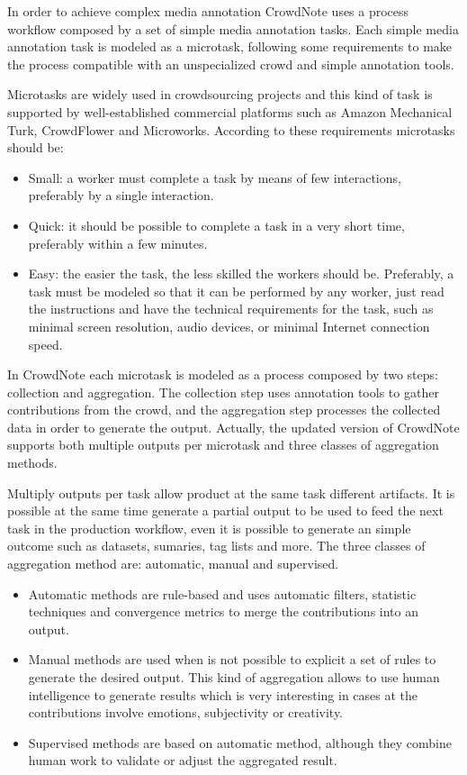 In order to achieve complex media annotation CrowdNote uses a process workflow composed by a set of simple media annotation tasks. Each simple media annotation task is modeled as a microtask, following some requirements to make the process compatible with an unspecialized crowd and simple annotation tools. 

Microtasks are widely used in crowdsourcing projects and this kind of task is supported by well-established commercial platforms such as Amazon Mechanical Turk, CrowdFlower and Microworks.  According to these requirements microtasks should be:
\begin{itemize}
	\item{Small:} a worker must complete a task by means of few interactions, preferably by a single interaction.
	
	\item{Quick:} it should be possible to complete a task in a very short time, preferably within a few minutes.

	\item{Easy:} the easier the task, the less skilled the workers should be. Preferably, a task must be modeled so that it can be performed by any worker, just read the instructions and have the technical requirements for the task, such as minimal screen resolution, audio devices, or minimal Internet connection speed.
\end{itemize}

\pagebreak
In CrowdNote each microtask is modeled as a process composed by two steps: collection and aggregation. The collection step uses annotation tools to gather contributions from the crowd, and the aggregation step processes the collected data in order to generate the output. Actually, the updated version of CrowdNote supports both multiple outputs per microtask and three classes of aggregation methods.

Multiply outputs per task allow product at the same task different artifacts. It is possible at the same time generate a partial output to be used to feed the next task in the production workflow, even it is possible to generate an simple outcome such as datasets, sumaries, tag lists and more. The three classes of aggregation method are: automatic, manual and supervised.
 
\begin{itemize}

 
\item{Automatic methods} are rule-based and uses automatic filters, statistic techniques and convergence metrics to merge the contributions into an output.
 
\item{Manual methods} are used when is not possible to explicit a set of rules to generate the desired output. This kind of aggregation allows to use human intelligence to generate results which is very interesting in cases at the contributions involve emotions, subjectivity or creativity. 

\item{Supervised methods} are based on automatic method, although they combine human work to validate or adjust the aggregated result.
\end{itemize} 


